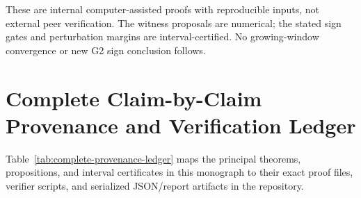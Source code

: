 \documentclass[11pt]{article}
\theoremstyle{remark}
\begin{document}
These are internal computer-assisted proofs with reproducible inputs,
not external peer verification. The witness proposals are numerical;
the stated sign gates and perturbation margins are interval-certified.
No growing-window convergence or new G2 sign conclusion follows.



\section{Complete Claim-by-Claim Provenance and Verification Ledger}\label{app:provenance-ledger}

Table~\ref{tab:complete-provenance-ledger} maps the principal theorems, propositions, and interval certificates in this monograph to their exact proof files, verifier scripts, and serialized JSON/report artifacts in the repository.
\end{document}
